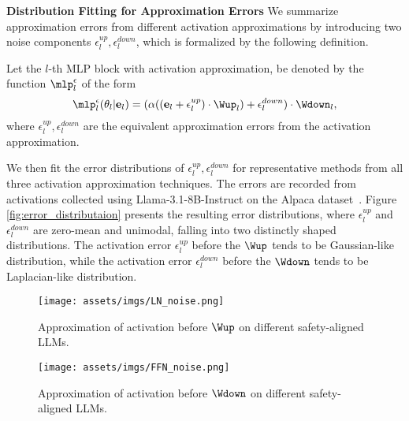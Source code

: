 \textbf{Distribution Fitting for Approximation Errors} We summarize approximation errors from different activation approximations by introducing two noise components $\epsilon^{up}_l,\epsilon^{down}_l$, which is formalized by the following definition.
\begin{definition}
Let the $l$-th MLP block with activation approximation, be denoted by the function $\mlp_l^{\epsilon}$  of the form
$$
    \mlp_l^{\epsilon}(\theta_l|\mathbf{e}_{l}) = (\alpha((\mathbf{e}_{l}+\epsilon^{up}_l)\cdot \Wup_l)+ \epsilon^{down}_l)\cdot\Wdown_l , 
$$
where $\epsilon^{up}_l,\epsilon^{down}_l$ are the equivalent approximation errors from the activation approximation. 
\end{definition}


We then fit the error distributions of $\epsilon^{up}_l,\epsilon^{down}_l$ for representative methods from all three activation approximation techniques. The errors are recorded from activations collected using Llama-3.1-8B-Instruct on the Alpaca dataset~\cite{alpaca}.
Figure \ref{fig:error_distributaion} presents the resulting error distributions, where $\epsilon^{up}_l$ and $\epsilon^{down}_l$ are zero-mean and unimodal, falling into two distinctly shaped distributions. The activation error $\epsilon^{up}_l$ before the $\Wup$ tends to be Gaussian-like distribution, while the activation error $\epsilon^{down}_l$ before the $\Wdown$ tends to be Laplacian-like distribution.



\begin{figure*}[!h]
    \centering
    \texttt{[image: assets/imgs/LN\_noise.png]}
    \caption{Approximation of activation before $\Wup$ on different safety-aligned LLMs.}
    \label{fig:ln_noise}
\end{figure*}

\begin{figure*}[!h]
    \centering
    \texttt{[image: assets/imgs/FFN\_noise.png]}
    \caption{Approximation of activation before $\Wdown$ on different safety-aligned LLMs.}
    \label{fig:ffn_noise}
\end{figure*}

